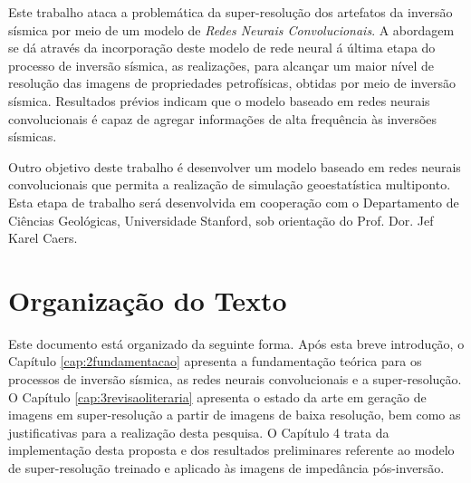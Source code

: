Este trabalho ataca a problemática da super-resolução dos artefatos da inversão sísmica
por meio de um modelo de \textit{Redes Neurais Convolucionais}.
A abordagem se dá através da incorporação deste modelo de rede neural á última
etapa do processo de inversão sísmica, as realizações, para alcançar um maior nível de
resolução das imagens de propriedades petrofísicas, obtidas por meio de inversão sísmica.
Resultados prévios indicam que o modelo baseado em redes neurais convolucionais é capaz
de agregar informações de alta frequência às inversões sísmicas.

Outro objetivo deste trabalho é desenvolver um modelo baseado em redes neurais convolucionais que permita a
realização de simulação geoestatística multiponto. Esta etapa de trabalho será desenvolvida
em cooperação com o Departamento de Ciências Geológicas, Universidade Stanford, sob
orientação do Prof. Dor. Jef Karel Caers.


\section{Organização do Texto}

Este documento está organizado da seguinte forma. Após esta breve introdução, o
Capítulo \ref{cap:2fundamentacao} apresenta a fundamentação teórica para os
processos de inversão sísmica, as redes neurais 
convolucionais e a super-resolução. O Capítulo \ref{cap:3revisaoliteraria} 
apresenta o estado da arte 
em geração de imagens em super-resolução a partir de imagens de baixa resolução, bem como as justificativas 
para a realização desta pesquisa.
O Capítulo 4 %
trata da implementação desta proposta e dos resultados 
preliminares referente ao modelo de super-resolução treinado e aplicado às imagens 
de impedância pós-inversão. 
